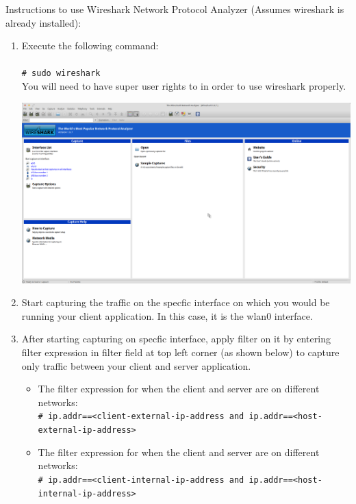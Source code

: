 \documentclass{article}
\newcommand{\shellcmd}[1]{\\\indent\indent\texttt{\footnotesize\# #1}\\}
\begin{document}
Instructions to use Wireshark Network Protocol Analyzer (Assumes wireshark is already installed):
\begin{enumerate}
	\item Execute the following command: \\
	\shellcmd{sudo wireshark}
	You will need to have super user rights to in order to use wireshark properly.
	
	\includegraphics[width=\textwidth]{wireshark-1-screenshot}

	\item Start capturing the traffic on the specfic interface on which you would be running your client application. In this case, it is the wlan0 interface.

	\item After starting capturing on specfic interface, apply filter on it by entering filter expression in filter field at top left corner (as shown below) to capture only traffic between your client and server application.
		\begin{itemize}
        	\item The filter expression for when the client and server are on different networks:
     		\shellcmd{ip.addr==<client-external-ip-address and ip.addr==<host-external-ip-address>}
        	\item The filter expression for when the client and server are on different networks:
     		\shellcmd{ip.addr==<client-internal-ip-address and ip.addr==<host-internal-ip-address>}
    	\end{itemize}

\end{enumerate}


\end{document}
